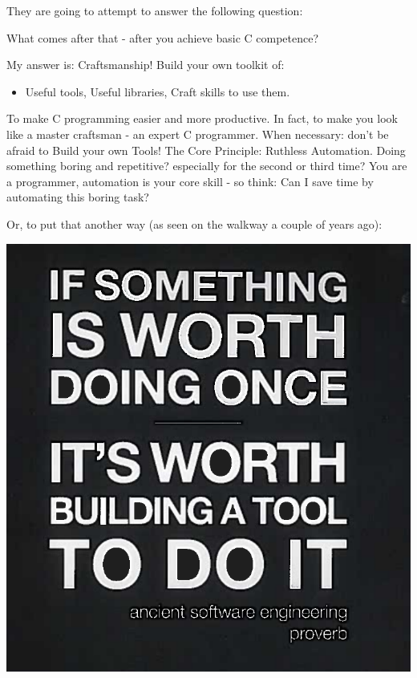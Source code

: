 \documentclass[aspectratio=169]{beamer}
\begin{document}
\begin{frame}

    \large
    They are going to attempt to answer the following question:
    
    \alert{What comes after that - after you achieve basic C competence?}

    \begin{itemize}
    \pitem
      My answer is: \alert{Craftsmanship!}
    \pitem
      Build your own \alert{toolkit} of:
      \begin{itemize}
      \item
      \alert{Useful tools},
      \pitem
      \alert{Useful libraries},
      \pitem
      \alert{Craft skills} to use them.
      \end{itemize}
    \pitem
      To make C programming easier and more productive.
    \pitem
      In fact, to make you look like a \alert{master craftsman} - an expert C programmer.
    \pitem
      When necessary: don't be afraid to \alert{Build your own Tools!}
    \pitem
      The Core Principle: \alert{Ruthless Automation}.
    \pitem
      Doing something boring and repetitive?
    \pause
      especially for the second or third time?
    \pitem
      You are a \alert{programmer}, automation is your core skill -
      so think:
      \alert{Can I save time by automating this boring task?}
    \end{itemize}
\end{frame}

\begin{frame}
Or, to put that another way (as seen on the walkway a couple of years ago):

\centering
\vspace{10pt}
\includegraphics[height=0.8\textheight]{Build.png}

\end{frame}
\end{document}
